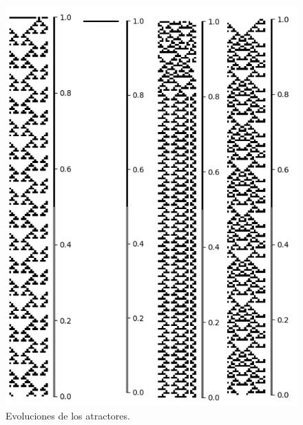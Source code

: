 \documentclass[11pt]{article}
\begin{document}
			\begin{figure}[H]
			\centering
			\includegraphics[scale=0.3]{resources/Atractores22/atractor_22_size_20_res.png}
			\caption{Evoluciones de los atractores.}\label{fig:picture}
			\end{figure}
\end{document}
